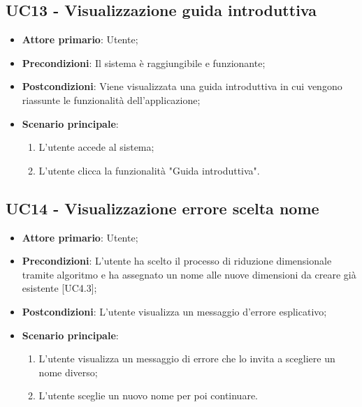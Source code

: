 \subsection{UC13 - Visualizzazione guida introduttiva}
\begin{itemize}
	\item \textbf{Attore primario}: Utente;
	\item \textbf{Precondizioni}: Il sistema è raggiungibile e funzionante;
	\item \textbf{Postcondizioni}: Viene visualizzata una guida introduttiva in cui vengono riassunte le funzionalità dell'applicazione;
	\item \textbf{Scenario principale}:
		\begin{enumerate}
			\item L'utente accede al sistema;
			\item L'utente clicca la funzionalità "Guida introduttiva".
		\end{enumerate}
\end{itemize}

\subsection{UC14 - Visualizzazione errore scelta nome}
\begin{itemize}
	\item \textbf{Attore primario}: Utente;
	\item \textbf{Precondizioni}: L'utente ha scelto il processo di riduzione dimensionale tramite algoritmo e ha assegnato un nome alle nuove dimensioni da creare già esistente [UC4.3];
	\item \textbf{Postcondizioni}: L'utente visualizza un messaggio d'errore esplicativo;
	\item \textbf{Scenario principale}:
		\begin{enumerate}
			\item L'utente visualizza un messaggio di errore che lo invita a scegliere un nome diverso;
			\item L'utente sceglie un nuovo nome per poi continuare.
		\end{enumerate}
\end{itemize}